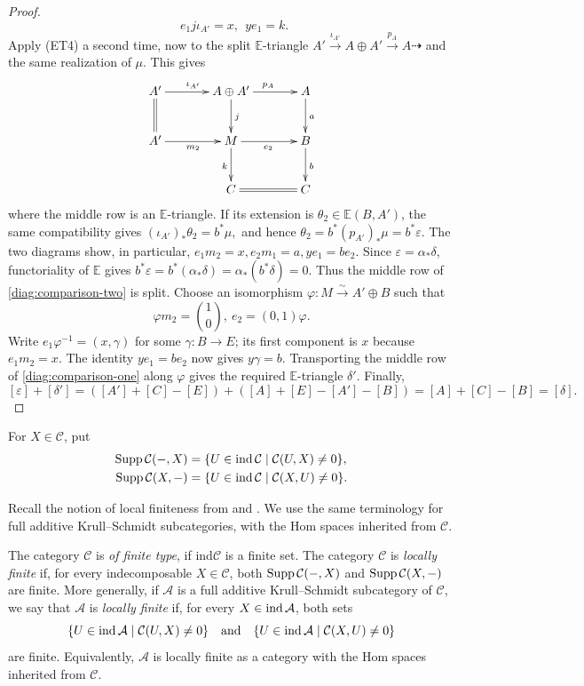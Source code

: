 \documentclass[11pt, twoside]{article}
\def\A{\mathcal{A}}
\def\C{\mathcal{C}}
\def\E{\mathbb{E}}
\numberwithin{equation}{section}
\begin{document}
\begin{proof}
\[~~
 e_1j\iota_{A'}=x,
~~
 ye_1=k.
\]
Apply (ET4) a second time, now to the split $\E$-triangle
$A'\xrightarrow{\iota_{A'}}A\oplus A'\xrightarrow{p_A}A\dashrightarrow$
and the same realization of $\mu$.  This gives
\begin{equation}\label{diag:comparison-two}
\begin{array}{l}
\xymatrix@C=3.5em@R=2.6em{
 A' \ar[r]^{\iota_{A'}}\ar@{=}[d] &
 A\oplus A' \ar[r]^{p_A}\ar[d]^{j} &
 A \ar[d]^{a} \\
 A' \ar[r]_{m_2} &
 M \ar[r]_{e_2}\ar[d]_{k} &
 B \ar[d]^{b} \\
 & C \ar@{=}[r] & C
}
\end{array}
\end{equation}
where the middle row is an $\E$-triangle.  If its extension is
$\theta_2\in\E(B,A')$, the same compatibility gives
$
 (\iota_{A'})_*\theta_2=b^*\mu,
$
and hence
$
 \theta_2=b^*(p_{A'})_*\mu=b^*\varepsilon.
$
The two diagrams show, in particular,
$
 e_1m_2=x,
 e_2m_1=a,
 ye_1=be_2.
$
Since $\varepsilon=\alpha_*\delta$, functoriality of $\E$ gives
$
 b^*\varepsilon
 =b^*(\alpha_*\delta)
 =\alpha_*(b^*\delta)=0.
$
Thus the middle row of \eqref{diag:comparison-two} is split.  Choose an isomorphism
$\varphi\colon M\xrightarrow{\sim}A'\oplus B$ such that
\[
 \varphi m_2=\binom{1}{0},
~
 e_2=(0,1)\varphi.
\]
Write
$
 e_1\varphi^{-1}=(x,\gamma)
$
for some $\gamma\colon B\to E$; its first component is $x$ because
$e_1m_2=x$.  The identity $ye_1=be_2$ now gives $y\gamma=b$.  Transporting
the middle row of \eqref{diag:comparison-one} along $\varphi$ gives the required $\E$-triangle
$\delta'$.  Finally,
\[
 [\varepsilon]+[\delta']
 =([A']+[C]-[E])+([A]+[E]-[A']-[B])
 =[A]+[C]-[B]=[\delta].
\]
\end{proof}

For $X\in\C$, put
\begin{align*}
 \Supp\C(-,X)&=\{U\in\ind\C\mid\C(U,X)\ne0\},\\
 \Supp\C(X,-)&=\{U\in\ind\C\mid\C(X,U)\ne0\}.
\end{align*}

Recall the notion of local finiteness from \cite[Definition 2.1]{XiaoZhu2002} and
\cite[Definition~3.1]{ZhuZhuang2021}.  We use the same terminology for full
additive Krull--Schmidt subcategories, with the Hom spaces inherited from
$\C$.

\begin{definition} \label{locall}
The category $\C$ is \emph{of finite type}, if ind$\C$ is a finite set.
The category $\C$ is \emph{locally finite} if, for every indecomposable
$X\in\C$, both $\Supp\C(-,X)$ and $\Supp\C(X,-)$ are finite.
More generally, if $\A$ is a full additive Krull--Schmidt subcategory of
$\C$, we say that $\A$ is \emph{locally finite} if, for every
$X\in\ind\A$, both sets
\[
 \{U\in\ind\A\mid\C(U,X)\ne0\}
 \quad\text{and}\quad
 \{U\in\ind\A\mid\C(X,U)\ne0\}
\]
are finite.  Equivalently, $\A$ is locally finite as a category with the
Hom spaces inherited from $\C$.
\end{definition}
\end{document}

